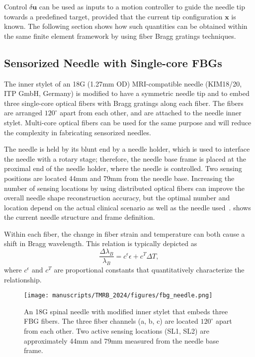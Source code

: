 Control $\delta\mathbf{u}$ can be used as inputs to a motion controller to guide the needle tip towards a predefined target, provided that the current tip configuration $\mathbf{x}$ is known. The following section shows how such quantities can be obtained within the same finite element framework by using fiber Bragg gratings techniques.

\subsection{Sensorized Needle with Single-core FBGs}
\label{sec:chap-3-sensorized-needle}

The inner stylet of an 18G (1.27mm OD) MRI-compatible needle (KIM18/20, ITP GmbH, Germany) is modified to have a symmetric needle tip and to embed three single-core optical fibers with Bragg gratings along each fiber. The fibers are arranged $120^{\circ}$ apart from each other, and are attached to the needle inner stylet. Multi-core optical fibers can be used for the same purpose and will reduce the complexity in fabricating sensorized needles.

The needle is held by its blunt end by a needle holder, which is used to interface the needle with a rotary stage; therefore, the needle base frame is placed at the proximal end of the needle holder, where the needle is controlled. Two sensing positions are located 44mm and 79mm from the needle base. Increasing the number of sensing locations by using distributed optical fibers can improve the overall needle shape reconstruction accuracy, but the optimal number and location depend on the actual clinical scenario as well as the needle used~\parencite{schaeferOptimizedNeedleShape2019,issatayevaDesignAnalysisFiberoptic2021}.  shows the current needle structure and frame definition.

Within each fiber, the change in fiber strain and temperature can both cause a shift in Bragg wavelength. This relation is typically depicted as
\begin{equation}
  \label{eq:chap-3-fbg-strain-temperature}
  \frac{\Delta\lambda_B}{\lambda_B} = c^{\epsilon}\epsilon + c^T\Delta T,
\end{equation}
where $c^{\epsilon}$ and $c^T$ are proportional constants that quantitatively characterize the relationship.

\begin{figure}[tb]
  \centering
  \texttt{[image: manuscripts/TMRB\_2024/figures/fbg\_needle.png]}
  \caption{An 18G spinal needle with modified inner stylet that embeds three FBG fibers. The three fiber channels (a, b, c) are located $120^{\circ}$ apart from each other. Two active sensing locations (SL1, SL2) are approximately 44mm and 79mm measured from the needle base frame.}
  \label{fig:chap-3-fbg-needle-schematic}
\end{figure}

